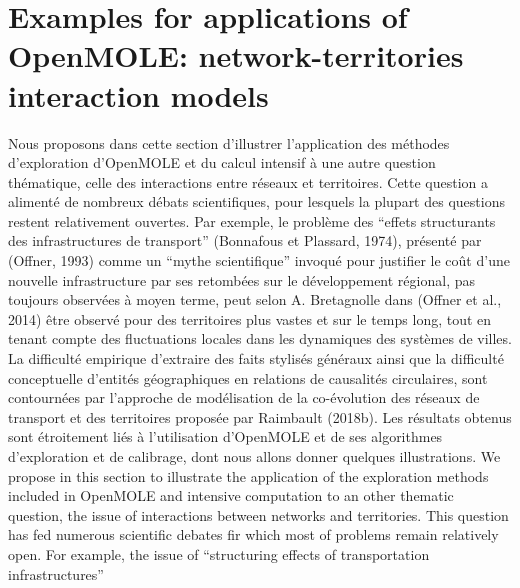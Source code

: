 \documentclass[10pt]{article}
\begin{document}
\section{Examples for applications of OpenMOLE: network-territories interaction models}


Nous proposons dans cette section d’illustrer l’application des méthodes d’exploration d’OpenMOLE et du calcul intensif à une autre question thématique, celle des interactions entre réseaux et territoires. Cette question a alimenté de nombreux débats scientifiques, pour lesquels la plupart des questions restent relativement ouvertes. Par exemple, le problème des “effets structurants des infrastructures de transport” (Bonnafous et Plassard, 1974), présenté par (Offner, 1993) comme un “mythe scientifique” invoqué pour justifier le coût d’une nouvelle infrastructure par ses retombées sur le développement régional, pas toujours observées à moyen terme, peut selon A. Bretagnolle dans (Offner et al., 2014) être observé pour des territoires plus vastes et sur le temps long, tout en tenant compte des fluctuations locales dans les  dynamiques des systèmes de villes. La difficulté empirique d’extraire des faits stylisés généraux ainsi que la difficulté conceptuelle d'entités géographiques en relations de causalités circulaires, sont contournées par l’approche de modélisation de la co-évolution des réseaux de transport et des territoires proposée par Raimbault (2018b). Les résultats obtenus sont étroitement liés à l’utilisation d’OpenMOLE et de ses algorithmes d’exploration et de calibrage, dont nous allons donner quelques illustrations.
We propose in this section to illustrate the application of the exploration methods included in OpenMOLE and intensive computation to an other thematic question, the issue of interactions between networks and territories. This question has fed numerous scientific debates fir which most of problems remain relatively open. For example, the issue of ``structuring effects of transportation infrastructures''
\end{document}
